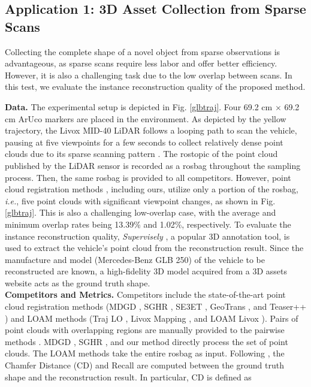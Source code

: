 \subsection{Application 1: 3D Asset Collection from Sparse Scans} \label{test2}
Collecting the complete shape of a novel object \cite{mending} from sparse observations is advantageous, as sparse scans require less labor and offer better efficiency. However, it is also a challenging task due to the low overlap between scans. In this test, we evaluate the instance reconstruction quality of the proposed method. \par
\noindent\textbf{Data.}
The experimental setup is depicted in Fig. \ref{glbtraj}. Four 69.2 cm $\times$ 69.2 cm ArUco \cite{aruco} markers are placed in the environment. 
%
As depicted by the yellow trajectory, the Livox MID-40 LiDAR follows a looping path to scan the vehicle, pausing at five viewpoints for a few seconds to collect relatively dense point clouds due to its sparse scanning pattern \cite{lloam}. 
%
The rostopic of the point cloud published by the LiDAR sensor is recorded as a rosbag throughout the sampling process. Then, the same rosbag is provided to all competitors. 
%
However, point cloud registration methods \cite{mdgd,sghr,se3et,geotransformer,teaser}, including ours, utilize only a portion of the rosbag, \textit{i.e.}, five point clouds with significant viewpoint changes, as shown in Fig. \ref{glbtraj}. This is also a challenging low-overlap case, with the average and minimum overlap rates being 13.39\% and 1.02\%, respectively. To evaluate the instance reconstruction quality, \textit{Supervisely} \cite{super}, a popular 3D annotation tool, is used to extract the vehicle's point cloud from the reconstruction result.
%
Since the manufacture and model (Mercedes-Benz GLB 250) of the vehicle to be reconstructed are known, a high-fidelity 3D model acquired from a 3D assets website acts as the ground truth shape.
\\
\noindent\textbf{Competitors and Metrics.}
Competitors include the state-of-the-art point cloud registration methods (MDGD \cite{mdgd}, SGHR \cite{sghr}, SE3ET \cite{se3et}, GeoTrans \cite{geotransformer}, and Teaser++ \cite{teaser}) and LOAM methods (Traj LO \cite{traj}, Livox Mapping \cite{sdk}, and LOAM Livox \cite{lloam}). Pairs of point clouds with overlapping regions are manually provided to the pairwise methods \cite{se3et,geotransformer,teaser}. MDGD \cite{mdgd}, SGHR \cite{sghr}, and our method directly process the set of point clouds. The LOAM methods take the entire rosbag as input. Following \cite{cd}, the Chamfer Distance (CD) and Recall are computed between the ground truth shape and the reconstruction result. In particular, CD is defined as 
